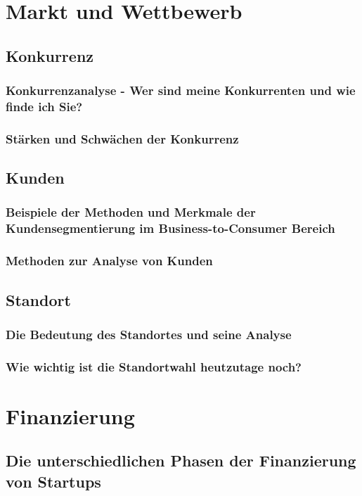 \chapter{Markt und Wettbewerb}
\section{Konkurrenz}
\subsection{Konkurrenzanalyse - Wer sind meine Konkurrenten und wie finde ich Sie?}

\subsection{Stärken und Schwächen der Konkurrenz}

\section{Kunden}
\subsection{Beispiele der Methoden und Merkmale der Kundensegmentierung im Business-to-Consumer Bereich}

\subsection{Methoden zur Analyse von Kunden}

\section{Standort}
\subsection{Die Bedeutung des Standortes und seine Analyse}

\subsection{Wie wichtig ist die Standortwahl heutzutage noch?}

\chapter{Finanzierung}
\section{Die unterschiedlichen Phasen der Finanzierung von Startups}

